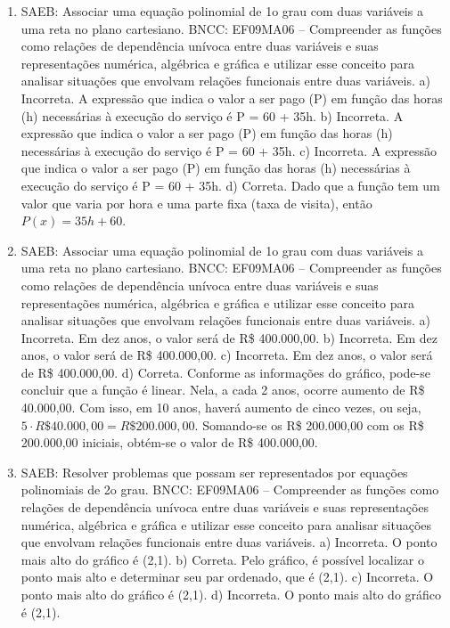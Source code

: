 \begin{enumerate}
\item
SAEB: Associar uma equação polinomial de 1o grau com duas variáveis a uma reta no plano cartesiano.
BNCC: EF09MA06 -- Compreender as funções como relações de dependência unívoca entre duas variáveis e suas representações numérica, algébrica e gráfica e utilizar esse conceito para analisar situações que envolvam relações funcionais entre duas variáveis.
a) Incorreta. A expressão que indica o valor a ser pago (P) em função das
horas (h) necessárias à execução do serviço é P = 60 + 35h.   
b) Incorreta. A expressão que indica o valor a ser pago (P) em função das
horas (h) necessárias à execução do serviço é P = 60 + 35h.  
c) Incorreta. A expressão que indica o valor a ser pago (P) em função das
horas (h) necessárias à execução do serviço é P = 60 + 35h.  
d) Correta. Dado que a função tem um valor que varia por hora e uma parte fixa (taxa
de visita), então $P(x)=35h+60$.

\item
SAEB: Associar uma equação polinomial de 1o grau com duas variáveis a uma reta no plano cartesiano.
BNCC: EF09MA06 -- Compreender as funções como relações de dependência unívoca entre duas variáveis e suas representações numérica, algébrica e gráfica e utilizar esse conceito para analisar situações que envolvam relações funcionais entre duas variáveis.
a) Incorreta. Em dez anos, o valor será de R\$ 400.000,00.
b) Incorreta. Em dez anos, o valor será de R\$ 400.000,00.
c) Incorreta. Em dez anos, o valor será de R\$ 400.000,00.
d) Correta. Conforme as informações do gráfico, pode-se concluir que a
função é linear. Nela, a cada 2 anos, ocorre aumento de R\$ 40.000,00. Com isso,
em 10 anos, haverá aumento de cinco vezes, ou seja, 
$5 \cdot R\$ 40.000,00 = R\$ 200.000,00$. Somando-se os R\$ 200.000,00 com os 
R\$ 200.000,00 iniciais, obtém-se o valor de R\$ 400.000,00.

\item
SAEB: Resolver problemas que possam ser representados por equações polinomiais de 2o grau.
BNCC: EF09MA06 -- Compreender as funções como relações de dependência unívoca entre duas variáveis e suas representações numérica, algébrica e gráfica e utilizar esse conceito para analisar situações que envolvam relações funcionais entre duas variáveis.  
a) Incorreta. O ponto mais alto do gráfico é (2,1).
b) Correta. Pelo gráfico, é possível localizar o ponto mais alto e
determinar seu par ordenado, que é (2,1).  
c) Incorreta. O ponto mais alto do gráfico é (2,1).
d) Incorreta. O ponto mais alto do gráfico é (2,1).
\end{enumerate}

